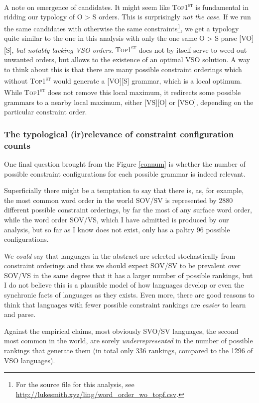 \documentclass{article}
\newcommand{\topf}{\textsc{Top1\textsuperscript{st}}}
\begin{document}
A note on emergence of candidates.
It might seem like {\topf} is fundamental in ridding our typology of O {\textgreater} S orders.
This is surprisingly \emph{not the case}.
If we run the same candidates with otherwise the same constraints\footnote{For the source file for this analysis, see \href{http://lukesmith.xyz/ling/word_order_wo_topf.csv}{http://lukesmith.xyz/ling/word\_order\_wo\_topf.csv}.}, we get a typology quite similar to the one in this analysis with only the one same O {\textgreater} S parse [VO][S], \emph{but notably lacking VSO orders}.
{\topf} does not by itself serve to weed out unwanted orders, but allows to the existence of an optimal VSO solution.
A way to think about this is that there are many possible constraint orderings which without {\topf} would generate a [VO][S] grammar, which is a local optimum.
While {\topf} does not remove this local maximum, it redirects some possible grammars to a nearby local maximum, either [VS][O] or [VSO], depending on the particular constraint order.

\subsubsection{The typological (ir)relevance of constraint configuration counts\label{numanal}}

One final question brought from the Figure \ref{connum} is whether the number of possible constraint configurations for each possible grammar is indeed relevant.

Superficially there might be a temptation to say that there is, as, for example, the most common word order in the world SOV/SV is represented by 2880 different possible constraint orderings, by far the most of any surface word order, while the word order SOV/VS, which I have admitted is produced by our analysis, but so far as I know does not exist, only has a paltry 96 possible configurations.

We \emph{could} say that languages in the abstract are selected stochastically from constraint orderings and thus we should expect SOV/SV to be prevalent over SOV/VS in the same degree that it has a larger number of possible rankings, but I do not believe this is a plausible model of how languages develop or even the synchronic facts of languages as they exists.
Even more, there are good reasons to think that languages with fewer possible constraint rankings are \emph{easier} to learn and parse.

Against the empirical claims, most obviously SVO/SV languages, the second most common in the world, are sorely \emph{underrepresented} in the number of possible rankings that generate them (in total only 336 rankings, compared to the 1296 of VSO languages).
\end{document}
